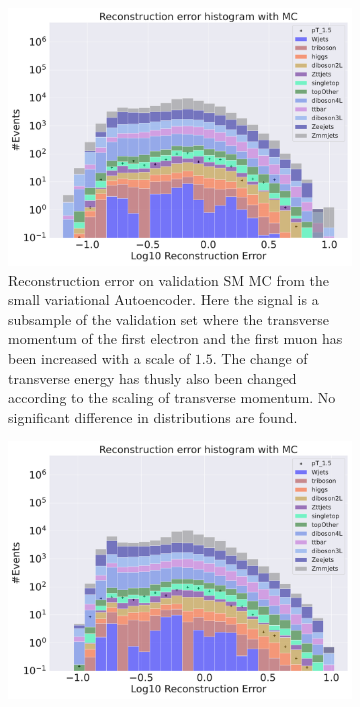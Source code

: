 \begin{figure}[h!]
    \centering
    \begin{subfigure}{.45\textwidth}
        \includegraphics[width=\textwidth]{Figures/VAE_testing/small/b_data_recon_big_rm3_feats_sig_pT_1.5.pdf}
        \caption{Reconstruction error on validation SM MC from the small variational Autoencoder. Here the signal is a subsample of the validation 
        set where the transverse momentum of the first electron and the first muon has been increased with a scale of $1.5$. The change of transverse 
        energy has thusly also been changed according to the scaling of transverse momentum. No significant difference in distributions are found. }
        \label{fig:VAE_small_pt_1_5}
    \end{subfigure}
    \hfill 
    \begin{subfigure}{.45\textwidth}
        \includegraphics[width=\textwidth]{Figures/VAE_testing/big/b_data_recon_big_rm3_feats_sig_pT_1.5.pdf}

\end{subfigure}
\end{figure}
